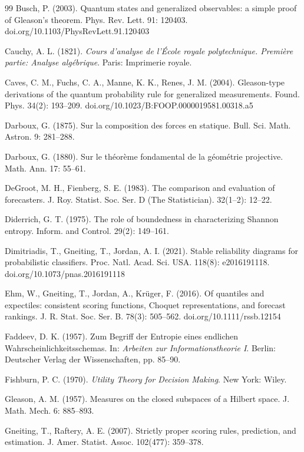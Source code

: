 \documentclass{article}
\theoremstyle{plain}
\theoremstyle{definition}
\begin{document}
\begin{thebibliography}{99}
Busch, P. (2003). Quantum states and generalized observables: a simple proof
of Gleason's theorem. Phys. Rev. Lett. 91: 120403.
doi.org/10.1103/PhysRevLett.91.120403

Cauchy, A. L. (1821). \emph{Cours d'analyse de l'\'Ecole royale polytechnique.
Premi\`ere partie: Analyse alg\'ebrique}. Paris: Imprimerie royale.

Caves, C. M., Fuchs, C. A., Manne, K. K., Renes, J. M. (2004). Gleason-type
derivations of the quantum probability rule for generalized measurements.
Found. Phys. 34(2): 193--209. doi.org/10.1023/B:FOOP.0000019581.00318.a5

Darboux, G. (1875). Sur la composition des forces en statique. Bull. Sci.
Math. Astron. 9: 281--288.

Darboux, G. (1880). Sur le th\'eor\`eme fondamental de la g\'eom\'etrie
projective. Math. Ann. 17: 55--61.

DeGroot, M. H., Fienberg, S. E. (1983). The comparison and evaluation of
forecasters. J. Roy. Statist. Soc. Ser. D (The Statistician). 32(1--2):
12--22.

Diderrich, G. T. (1975). The role of boundedness in characterizing Shannon
entropy. Inform. and Control. 29(2): 149--161.

Dimitriadis, T., Gneiting, T., Jordan, A. I. (2021). Stable reliability
diagrams for probabilistic classifiers. Proc. Natl. Acad. Sci. USA. 118(8):
e2016191118. doi.org/10.1073/pnas.2016191118

Ehm, W., Gneiting, T., Jordan, A., Kr\"uger, F. (2016). Of quantiles and
expectiles: consistent scoring functions, Choquet representations, and
forecast rankings. J. R. Stat. Soc. Ser. B. 78(3): 505--562.
doi.org/10.1111/rssb.12154

Faddeev, D. K. (1957). Zum Begriff der Entropie eines endlichen
Wahrscheinlichkeitsschemas. In: \emph{Arbeiten zur Informationstheorie I}.
Berlin: Deutscher Verlag der Wissenschaften, pp. 85--90.

Fishburn, P. C. (1970). \emph{Utility Theory for Decision Making}. New York:
Wiley.

Gleason, A. M. (1957). Measures on the closed subspaces of a Hilbert space.
J. Math. Mech. 6: 885--893.

Gneiting, T., Raftery, A. E. (2007). Strictly proper scoring rules,
prediction, and estimation. J. Amer. Statist. Assoc. 102(477): 359--378.


\end{thebibliography}
\end{document}
